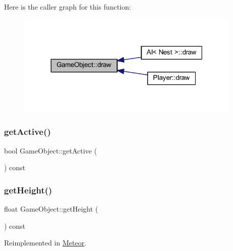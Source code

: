 Here is the caller graph for this function\+:
\nopagebreak
\begin{figure}[H]
\begin{center}
\leavevmode
\includegraphics[width=304pt]{class_game_object_aa6d7650a920e2dd79b0125560faf3807_icgraph}
\end{center}
\end{figure}
\mbox{\label{class_game_object_a27ad4c159678dc9593e0c372e8b3f6df}} 
\subsubsection{\texorpdfstring{get\+Active()}{getActive()}}
{\footnotesize\ttfamily bool Game\+Object\+::get\+Active (\begin{DoxyParamCaption}{ }\end{DoxyParamCaption}) const}

\mbox{\label{class_game_object_a927400453a0989e2f5b765031f4d861c}} 
\subsubsection{\texorpdfstring{get\+Height()}{getHeight()}}
{\footnotesize\ttfamily float Game\+Object\+::get\+Height (\begin{DoxyParamCaption}{ }\end{DoxyParamCaption}) const\hspace{0.3cm}{\ttfamily [virtual]}}



Reimplemented in \hyperlink{class_meteor_a967d79131976578613c0387bd6569aa6}{Meteor}.

